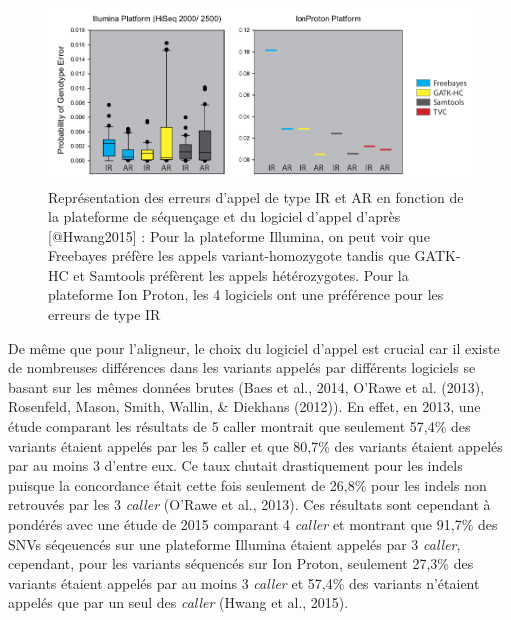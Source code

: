 \documentclass[12pt,twoside]{reedthesis}
\theoremstyle{definition}
\theoremstyle{definition}
\theoremstyle{remark}
\begin{document}
  \begin{figure}
  
  {\centering \includegraphics[scale=.50]{figure/snp_error_type} 
  
  }
  
  \caption[Représentation des erreurs d'appel de type IR et AR en fonction de la plateforme de séquençage et du logiciel d'appel]{Représentation des erreurs d'appel de type IR et AR en fonction de la plateforme de séquençage et du logiciel d'appel d'après [@Hwang2015] : Pour la plateforme Illumina, on peut voir que Freebayes préfère les appels variant-homozygote tandis que GATK-HC et Samtools préfèrent les appels hétérozygotes. Pour la plateforme Ion Proton, les 4 logiciels ont une préférence pour les erreurs de type IR}\label{fig:snperror}
  \end{figure}
  
  De même que pour l'aligneur, le choix du logiciel d'appel est crucial
  car il existe de nombreuses différences dans les variants appelés par
  différents logiciels se basant sur les mêmes données brutes (Baes et
  al., 2014, O'Rawe et al. (2013), Rosenfeld, Mason, Smith, Wallin, \&
  Diekhans (2012)). En effet, en 2013, une étude comparant les résultats
  de 5 caller montrait que seulement 57,4\% des variants étaient appelés
  par les 5 caller et que 80,7\% des variants étaient appelés par au moins
  3 d'entre eux. Ce taux chutait drastiquement pour les indels puisque la
  concordance était cette fois seulement de 26,8\% pour les indels non
  retrouvés par les 3 \emph{caller} (O'Rawe et al., 2013). Ces résultats
  sont cependant à pondérés avec une étude de 2015 comparant 4
  \emph{caller} et montrant que 91,7\% des SNVs séqeuencés sur une
  plateforme Illumina étaient appelés par 3 \emph{caller}, cependant, pour
  les variants séquencés sur Ion Proton, seulement 27,3\% des variants
  étaient appelés par au moins 3 \emph{caller} et 57,4\% des variants
  n'étaient appelés que par un seul des \emph{caller} (Hwang et al.,
  2015).
  
\end{document}
